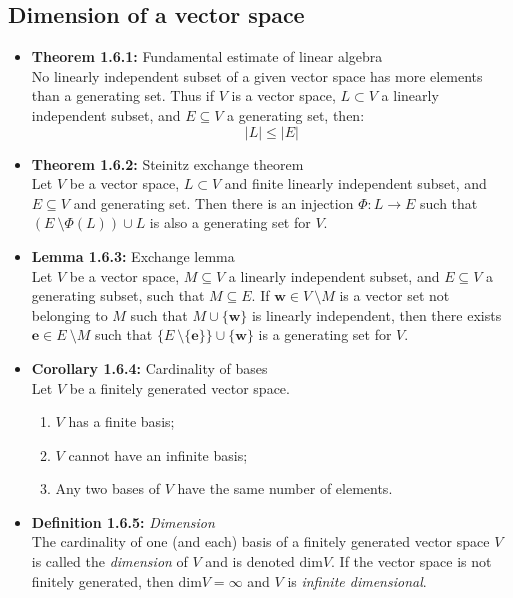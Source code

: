 \documentclass[11pt,a4paper]{article}
\begin{document}
\subsection{Dimension of a vector space}

\begin{itemize}

    \item \textbf{Theorem 1.6.1:} Fundamental estimate of linear algebra \\
        No linearly independent subset of a given vector space has more elements than a
        generating set.
        Thus if $V$ is a vector space, $L \subset V$ a linearly independent subset,
        and $E \subseteq V$ a generating set, then:
        \[
            |L| \leq |E|
        \]

    \item \textbf{Theorem 1.6.2:} Steinitz exchange theorem \\
        Let $V$ be a vector space, $L \subset V$ and finite linearly independent subset,
        and $E \subseteq V$ and generating set.
        Then there is an injection $\Phi : L \to E$ such that
        $(E \ \setminus \Phi(L)) \cup L$ is also a generating set for $V$.

    \item \textbf{Lemma 1.6.3:} Exchange lemma \\
        Let $V$ be a vector space, $M \subseteq V$ a linearly independent subset,
        and $E \subseteq V$ a generating subset, such that $M \subseteq E$.
        If $\textbf{w} \in V \ \setminus M$ is a vector set not belonging to $M$ such that
        $M \cup \{\textbf{w}\}$ is linearly independent, then there exists
        $\textbf{e} \in E \ \setminus M$ such that
        $\{E \ \setminus \{\textbf{e}\}\} \cup \{\textbf{w} \}$ is a generating set for $V$.

    \item \textbf{Corollary 1.6.4:} Cardinality of bases \\
        Let $V$ be a finitely generated vector space.
        \begin{enumerate}
            \item $V$ has a finite basis;
            \item $V$ cannot have an infinite basis;
            \item Any two bases of $V$ have the same number of elements.
        \end{enumerate}

    \item \textbf{Definition 1.6.5:} \emph{Dimension} \\
        The cardinality of one (and each) basis of a finitely generated vector space $V$
        is called the \emph{dimension} of $V$ and is denoted $\text{dim}V$.
        If the vector space is not finitely generated, then $\text{dim}V = \infty$
        and $V$ is \emph{infinite dimensional}.


\end{itemize}
\end{document}

